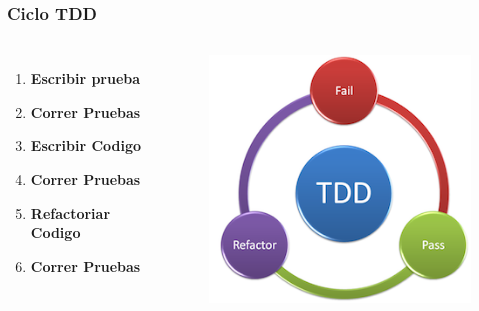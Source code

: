 \documentclass{beamer}
\begin{document}
\begin{frame}
\frametitle{Ciclo TDD}
\begin{columns}[c] %

\begin{enumerate}
\item \textbf{Escribir prueba}
\item {\color{red}\textbf{Correr Pruebas}}
\item \textbf{Escribir Codigo}
\item {\color{green}\textbf{Correr Pruebas}}
\item \textbf{Refactoriar Codigo}
\item {\color{purple}\textbf{Correr Pruebas}}
\end{enumerate}

\begin{figure}
\includegraphics[width=0.9\linewidth]{tdd.png}
\end{figure}
\end{columns}
\end{frame}
\end{document}
